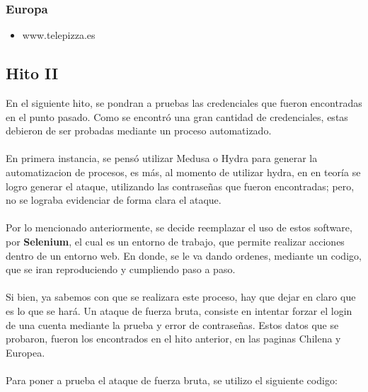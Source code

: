 \documentclass[]{article}
\begin{document}
        \subsubsection{Europa}
        \begin{itemize}
            \item www.telepizza.es
        \end{itemize}

\newpage

\subsection{Hito II}

En el siguiente hito, se pondran a pruebas las credenciales que fueron encontradas en el punto pasado. Como se encontró una gran cantidad
de credenciales, estas debieron de ser probadas mediante un proceso automatizado.
\\\\
En primera instancia, se pensó utilizar Medusa o Hydra para generar la automatizacion de procesos, es más, al momento de utilizar hydra, en
en teoría se logro generar el ataque, utilizando las contraseñas que fueron encontradas; pero, no se lograba evidenciar de forma clara
el ataque. 
\\\\
Por lo mencionado anteriormente, se decide reemplazar el uso de estos software, por \textbf{Selenium}, el cual es un entorno de trabajo, que
permite realizar acciones dentro de un entorno web. En donde, se le va dando ordenes, mediante un codigo, que se iran reproduciendo y 
cumpliendo paso a paso.
\\\\
Si bien, ya sabemos con que se realizara este proceso, hay que dejar en claro que es lo que se hará. Un ataque de fuerza bruta, consiste en 
intentar forzar el login de una cuenta mediante la prueba y error de contraseñas. Estos datos que se probaron, fueron los encontrados en el hito
anterior, en las paginas Chilena y Europea.
\\\\
Para poner a prueba el ataque de fuerza bruta, se utilizo el siguiente codigo:
\end{document}
